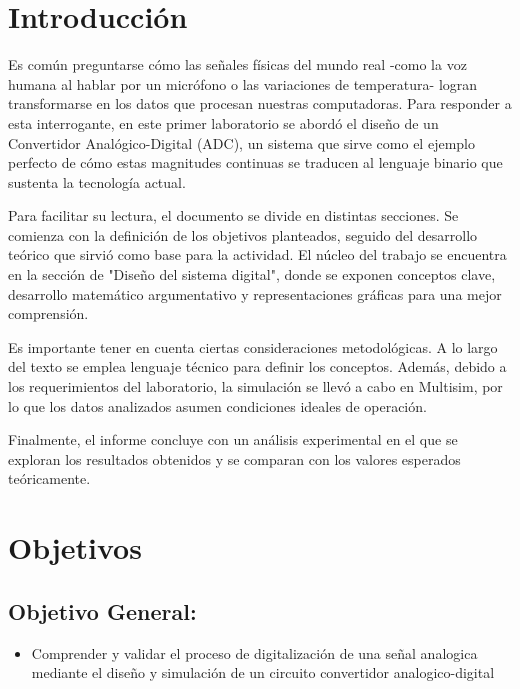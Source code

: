 \documentclass[12pt, a4paper]{article}
\begin{document}
	\tableofcontents 

	\newpage
	
	\section{Introducción}

    Es común preguntarse cómo las señales físicas del mundo real -como la voz humana al hablar por un micrófono o las variaciones de temperatura- logran transformarse en los datos que procesan nuestras computadoras. Para responder a esta interrogante, en este primer laboratorio se abordó el diseño de un Convertidor Analógico-Digital (ADC), un sistema que sirve como el ejemplo perfecto de cómo estas magnitudes continuas se traducen al lenguaje binario que sustenta la tecnología actual.

    Para facilitar su lectura, el documento se divide en distintas secciones. Se comienza con la definición de los objetivos planteados, seguido del desarrollo teórico que sirvió como base para la actividad. El núcleo del trabajo se encuentra en la sección de "Diseño del sistema digital", donde se exponen conceptos clave, desarrollo matemático argumentativo y representaciones gráficas para una mejor comprensión.

    Es importante tener en cuenta ciertas consideraciones metodológicas. A lo largo del texto se emplea lenguaje técnico para definir los conceptos. Además, debido a los requerimientos del laboratorio, la simulación se llevó a cabo en Multisim, por lo que los datos analizados asumen condiciones ideales de operación.

    Finalmente, el informe concluye con un análisis experimental en el que se exploran los resultados obtenidos y se comparan con los valores esperados teóricamente.

	\section{Objetivos}

    \subsection{Objetivo General:}
    \begin{itemize}
        \item Comprender y validar el proceso de digitalización de una señal analogica mediante el diseño y simulación de un circuito convertidor analogico-digital
    \end{itemize}
\end{document}
